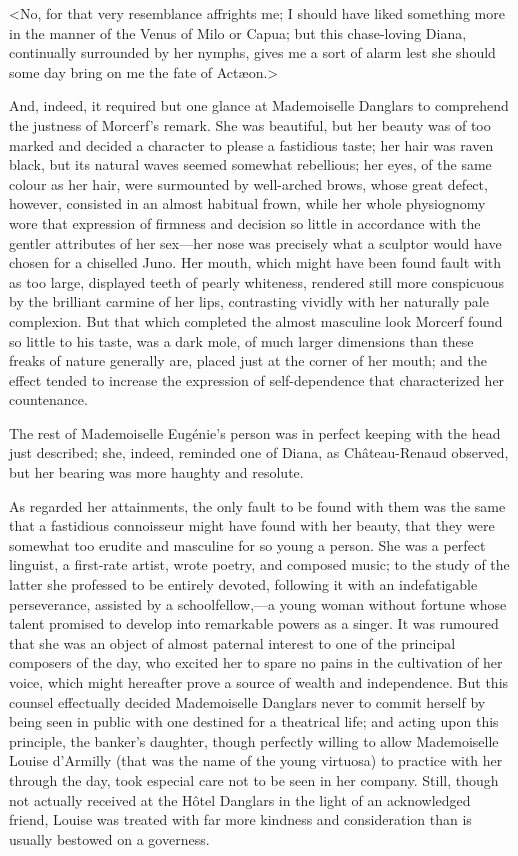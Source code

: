  <No, for that very resemblance affrights me; I should have liked something more in the manner of the Venus of Milo or Capua; but this chase-loving Diana, continually surrounded by her nymphs, gives me a sort of alarm lest she should some day bring on me the fate of Actæon.> 

 And, indeed, it required but one glance at Mademoiselle Danglars to comprehend the justness of Morcerf's remark. She was beautiful, but her beauty was of too marked and decided a character to please a fastidious taste; her hair was raven black, but its natural waves seemed somewhat rebellious; her eyes, of the same colour as her hair, were surmounted by well-arched brows, whose great defect, however, consisted in an almost habitual frown, while her whole physiognomy wore that expression of firmness and decision so little in accordance with the gentler attributes of her sex—her nose was precisely what a sculptor would have chosen for a chiselled Juno. Her mouth, which might have been found fault with as too large, displayed teeth of pearly whiteness, rendered still more conspicuous by the brilliant carmine of her lips, contrasting vividly with her naturally pale complexion. But that which completed the almost masculine look Morcerf found so little to his taste, was a dark mole, of much larger dimensions than these freaks of nature generally are, placed just at the corner of her mouth; and the effect tended to increase the expression of self-dependence that characterized her countenance. 

 The rest of Mademoiselle Eugénie's person was in perfect keeping with the head just described; she, indeed, reminded one of Diana, as Château-Renaud observed, but her bearing was more haughty and resolute. 

 As regarded her attainments, the only fault to be found with them was the same that a fastidious connoisseur might have found with her beauty, that they were somewhat too erudite and masculine for so young a person. She was a perfect linguist, a first-rate artist, wrote poetry, and composed music; to the study of the latter she professed to be entirely devoted, following it with an indefatigable perseverance, assisted by a schoolfellow,—a young woman without fortune whose talent promised to develop into remarkable powers as a singer. It was rumoured that she was an object of almost paternal interest to one of the principal composers of the day, who excited her to spare no pains in the cultivation of her voice, which might hereafter prove a source of wealth and independence. But this counsel effectually decided Mademoiselle Danglars never to commit herself by being seen in public with one destined for a theatrical life; and acting upon this principle, the banker's daughter, though perfectly willing to allow Mademoiselle Louise d'Armilly (that was the name of the young virtuosa) to practice with her through the day, took especial care not to be seen in her company. Still, though not actually received at the Hôtel Danglars in the light of an acknowledged friend, Louise was treated with far more kindness and consideration than is usually bestowed on a governess. 

